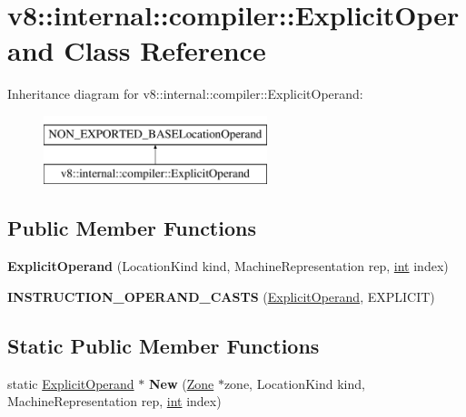 \hypertarget{classv8_1_1internal_1_1compiler_1_1ExplicitOperand}{}\section{v8\+:\+:internal\+:\+:compiler\+:\+:Explicit\+Operand Class Reference}
\label{classv8_1_1internal_1_1compiler_1_1ExplicitOperand}
Inheritance diagram for v8\+:\+:internal\+:\+:compiler\+:\+:Explicit\+Operand\+:\begin{figure}[H]
\begin{center}
\leavevmode
\includegraphics[height=2.000000cm]{classv8_1_1internal_1_1compiler_1_1ExplicitOperand}
\end{center}
\end{figure}
\subsection*{Public Member Functions}
\begin{DoxyCompactItemize}
\item 
\mbox{\label{classv8_1_1internal_1_1compiler_1_1ExplicitOperand_a43392873c60a1a7d726b64c0498f56af}} 
{\bfseries Explicit\+Operand} (Location\+Kind kind, Machine\+Representation rep, \mbox{\hyperlink{classint}{int}} index)
\item 
\mbox{\label{classv8_1_1internal_1_1compiler_1_1ExplicitOperand_ab430128e8c48d4fdec57b4da34626529}} 
{\bfseries I\+N\+S\+T\+R\+U\+C\+T\+I\+O\+N\+\_\+\+O\+P\+E\+R\+A\+N\+D\+\_\+\+C\+A\+S\+TS} (\mbox{\hyperlink{classv8_1_1internal_1_1compiler_1_1ExplicitOperand}{Explicit\+Operand}}, E\+X\+P\+L\+I\+C\+IT)
\end{DoxyCompactItemize}
\subsection*{Static Public Member Functions}
\begin{DoxyCompactItemize}
\item 
\mbox{\label{classv8_1_1internal_1_1compiler_1_1ExplicitOperand_aba19707a3d67b7f3debc43e22eac4fe8}} 
static \mbox{\hyperlink{classv8_1_1internal_1_1compiler_1_1ExplicitOperand}{Explicit\+Operand}} $\ast$ {\bfseries New} (\mbox{\hyperlink{classv8_1_1internal_1_1Zone}{Zone}} $\ast$zone, Location\+Kind kind, Machine\+Representation rep, \mbox{\hyperlink{classint}{int}} index)
\end{DoxyCompactItemize}


